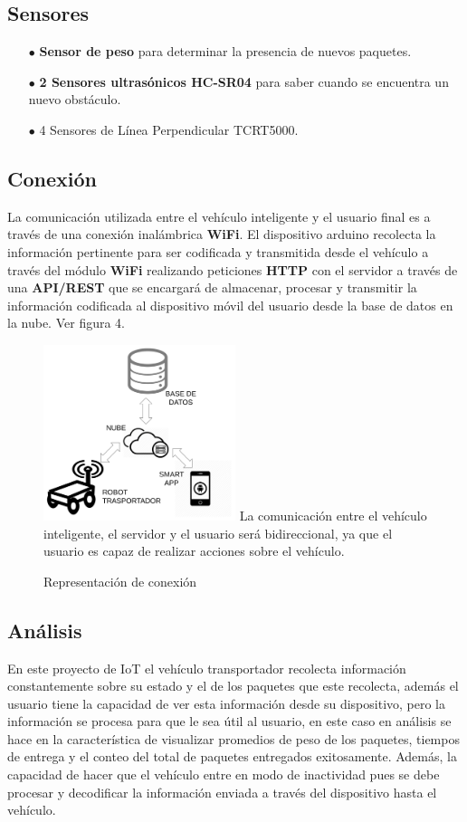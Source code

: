 \documentclass[osajnl,twocolumn,showpacs,superscriptaddress,10pt]{revtex4-1}
\begin{document}
\subsection{Sensores}
\begin{itemize}
    \item[$\bullet$]\textbf{Sensor de peso} para determinar la presencia de nuevos paquetes.
    \item[$\bullet$]\textbf{2 Sensores ultrasónicos HC-SR04} para saber cuando se encuentra un nuevo obstáculo.
    \item[$\bullet$]4 Sensores de Línea Perpendicular TCRT5000.
\end{itemize}
\subsection{Conexión}
    La comunicación utilizada entre el vehículo inteligente y el usuario final es a través de una conexión inalámbrica \textbf{WiFi}. El dispositivo arduino recolecta la información pertinente para ser codificada y transmitida desde el vehículo a través del módulo \textbf{WiFi} realizando peticiones \textbf{HTTP} con el servidor a través de una \textbf{API/REST} que se encargará de almacenar, procesar y transmitir la información codificada al dispositivo móvil del usuario desde la base de datos en la nube. Ver figura 4. \newline
\begin{figure} [H] \centering 
\caption{Representación de conexión}
\includegraphics[width=0.5\textwidth]{conexion.png} 
La comunicación entre el vehículo inteligente, el servidor y el usuario será bidireccional, ya que el usuario es capaz de realizar acciones sobre el vehículo.
\end{figure}
\subsection{Análisis}
    En este proyecto de IoT el vehículo transportador recolecta información constantemente sobre su estado y el de los paquetes que este recolecta, además el usuario tiene la capacidad de ver esta información desde su dispositivo, pero la información se procesa para que le sea útil al usuario, en este caso en análisis se hace en la característica de visualizar promedios de peso de los paquetes, tiempos de entrega y el conteo del total de paquetes entregados exitosamente. Además, la capacidad de hacer que el vehículo entre en modo de inactividad pues se debe procesar y decodificar la información enviada a través del dispositivo hasta el vehículo.
\end{document}

